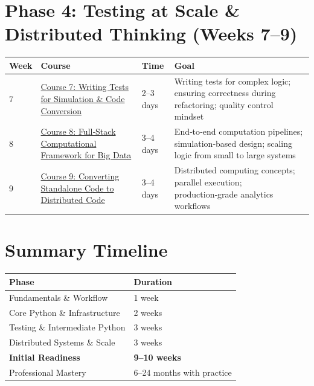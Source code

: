 \documentclass[12pt]{article}
\begin{document}
	\vspace{0.3cm}
	
	\section*{Phase 4: Testing at Scale \& Distributed Thinking (Weeks 7–9)}
	
	\begin{tabularx}{\textwidth}{|X|p{3cm}|p{3cm}|X|}
		\hline
		\textbf{Week} & \textbf{Course} & \textbf{Time} & \textbf{Goal} \\
		\hline
		7 & \href{https://www.udemy.com/course/writing-tests-for-simeng-python-code-conversion-concepts-101/}{Course 7: Writing Tests for Simulation \& Code Conversion} & 2–3 days & Writing tests for complex logic; ensuring correctness during refactoring; quality control mindset \\
		\hline
		8 & \href{https://www.udemy.com/course/full-stack-computational-framework-for-big-data-simulations/}{Course 8: Full‑Stack Computational Framework for Big Data} & 3–4 days & End‑to‑end computation pipelines; simulation‑based design; scaling logic from small to large systems \\
		\hline
		9 & \href{https://www.udemy.com/course/converting-standalone-code-to-distributed-code-for-analytics/}{Course 9: Converting Standalone Code to Distributed Code} & 3–4 days & Distributed computing concepts; parallel execution; production‑grade analytics workflows \\
		\hline
	\end{tabularx}
	
	\newpage
	
	\section*{ Summary Timeline}
	
	\begin{tabularx}{\textwidth}{|l|X|}
		\hline
		\textbf{Phase} & \textbf{Duration} \\
		\hline
		Fundamentals \& Workflow & 1 week \\
		\hline
		Core Python \& Infrastructure & 2 weeks \\
		\hline
		Testing \& Intermediate Python & 3 weeks \\
		\hline
		Distributed Systems \& Scale & 3 weeks \\
		\hline
		\textbf{Initial Readiness} & \textbf{\~9–10 weeks} \\
		\hline
		Professional Mastery & 6–24 months with practice \\
		\hline
	\end{tabularx}
	
\end{document}
